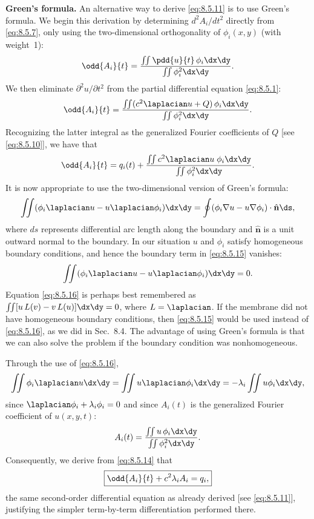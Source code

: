 \textbf{Green's formula.}
An alternative way to derive \eqref{eq:8.5.11} is to use Green's formula.  We begin this derivation by determining $d^2 A_i/dt^2$ directly from \eqref{eq:8.5.7}, only using the two-dimensional orthogonality of $\phi_i(x,y)$ (with weight~1):
\begin{equation}
\label{eq:8.5.12}
\odd{A_i}{t} = \frac{\iint \pdd{u}{t}\,\phi_i\dx\dy}{\iint \phi_i^2\dx\dy}.
\end{equation}
We then eliminate $\partial^2 u/\partial t^2$ from the partial differential equation \eqref{eq:8.5.1}:
\begin{equation}
\label{eq:8.5.13}
\odd{A_i}{t} = \frac{\iint (c^2\laplacian u + Q)\,\phi_i\dx\dy}{\iint \phi_i^2\dx\dy}.
\end{equation}
Recognizing the latter integral as the generalized Fourier coefficients of $Q$ [see \eqref{eq:8.5.10}], we have that
\begin{equation}
\label{eq:8.5.14}
\odd{A_i}{t} = q_i(t) + \frac{\iint c^2\laplacian u\;\phi_i\dx\dy}{\iint \phi_i^2\dx\dy}.
\end{equation}
It is now appropriate to use the two-dimensional version of Green's formula:
\begin{equation}
\label{eq:8.5.15}
\iint (\phi_i\laplacian u - u\laplacian\phi_i)\dx\dy = \oint (\phi_i\nabla u - u\nabla\phi_i)\cdot\hat{\mathbf{n}}\ds,
\end{equation}
where $ds$ represents differential arc length along the boundary and $\hat{\mathbf{n}}$ is a unit outward normal to the boundary.  In our situation $u$ and $\phi_i$ satisfy homogeneous boundary conditions, and hence the boundary term in \eqref{eq:8.5.15} vanishes:
\begin{equation}
\label{eq:8.5.16}
\iint (\phi_i\laplacian u - u\laplacian\phi_i)\dx\dy = 0.
\end{equation}
Equation \eqref{eq:8.5.16} is perhaps best remembered as $\iint [u\,L(v) - v\,L(u)]\dx\dy = 0$, where $L = \laplacian$.  If the membrane did not have homogeneous boundary conditions, then \eqref{eq:8.5.15} would be used instead of \eqref{eq:8.5.16}, as we did in Sec.~8.4.  The advantage of using Green's formula is that we can also solve the problem if the boundary condition was nonhomogeneous.

Through the use of \eqref{eq:8.5.16},
\[
\iint \phi_i\laplacian u\dx\dy = \iint u\laplacian\phi_i\dx\dy = -\lambda_i\iint u\phi_i\dx\dy,
\]
since $\laplacian\phi_i + \lambda_i\phi_i = 0$ and since $A_i(t)$ is the generalized Fourier coefficient of $u(x,y,t)$:
\begin{equation}
\label{eq:8.5.17}
A_i(t) = \frac{\iint u\,\phi_i\dx\dy}{\iint \phi_i^2\dx\dy}.
\end{equation}
Consequently, we derive from \eqref{eq:8.5.14} that
\begin{equation}
\label{eq:8.5.18}
\boxed{\odd{A_i}{t} + c^2\lambda_i A_i = q_i,}
\end{equation}
the same second-order differential equation as already derived [see \eqref{eq:8.5.11}], justifying the simpler term-by-term differentiation performed there.

